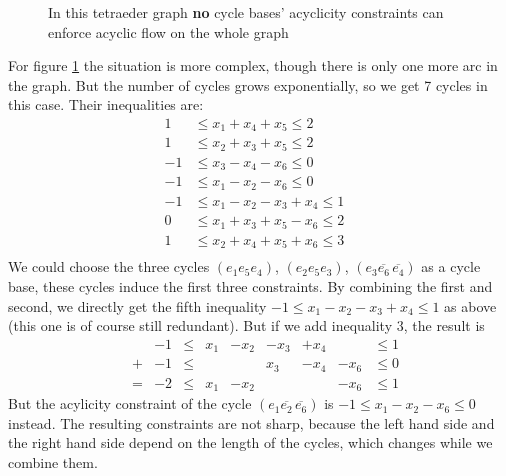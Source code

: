 \begin{figure}[h!]
\centering
{}
\caption{In this tetraeder graph \textbf{no} cycle bases' acyclicity constraints can enforce acyclic flow on the whole 
graph}
 \label{bild:reichtkreisbasis2}
\end{figure}
For figure \ref{bild:reichtkreisbasis2} the situation is more complex, though there is only one more arc in the graph. 
But the number of cycles grows exponentially, so we get 7 cycles in this case. Their inequalities are:
\begin{align*}
 1 &\le x_1+x_4+x_5\le 2&\\
 1&\le x_2+x_3+x_5\le 2& \\%
 -1&\le x_3-x_4-x_6\le 0\\
 -1&\le x_1-x_2-x_6\le 0\\ 
 -1 &\le x_1-x_2-x_3+x_4 \le 1&\\
 0 &\le x_1+x_3+x_5-x_6\le 2\\
 1&\le x_2+x_4+x_5+x_6\le 3\\
\end{align*}
We could choose the three cycles $(e_1 e_5 e_4)$, $(e_2 e_5 e_3)$, $(e_3 \overline{e_6}\, \overline{e_4})$ as a cycle 
base, these cycles induce the first three constraints. By combining the first and second, we directly get the fifth 
inequality $-1 \le x_1-x_2-x_3+x_4 \le 1$ as above (this one is of course still redundant). But if we add inequality 
$3$, the result is 
\begin{align*}
 &&-1 &\le &x_1&-x_2&-x_3&+x_4 &&\le 1\\
 &+&-1&\le &&&x_3&-x_4&-x_6&\le 0\\
 &=&-2&\le&x_1&-x_2&&&-x_6&\le 1
\end{align*}
But the acylicity constraint of the cycle $(e_1 \overline{e_2} \,\overline{e_6})$ is $-1\le x_1-x_2-x_6\le 0$ instead. 
The resulting constraints are not sharp, because the left hand side and the right hand side depend on the length of the 
cycles, which changes while we combine them.

